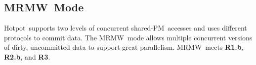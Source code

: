 \documentclass[sigconf]{acmart}
\renewcommand{\em}{\it}
\newcommand{\mycaption}[3]{\caption{\label{#1}{\bf #2} \em\small #3}}
\newcommand{\nvm}{PM}
\newcommand{\hotpot}{Hotpot}
\newcommand{\mrmw}{MRMW}
\newcommand{\cd}{CD}
\newcommand{\on}{ON}
\newcommand{\rb}{\textbf{R1.b}}
\newcommand{\rcm}{\textbf{R2.b}}
\newcommand{\re}{\textbf{R3}}
\providecommand{\DIFaddbegin}{} %
\providecommand{\DIFaddend}{} %
\providecommand{\DIFdelbegin}{} %
\providecommand{\DIFdelend}{} %
\providecommand{\DIFaddbeginFL}{} %
\providecommand{\DIFaddendFL}{} %
\providecommand{\DIFdelbeginFL}{} %
\providecommand{\DIFdelendFL}{} %
\begin{document}
{{\begin{figure}[th]
\begin{minipage}{3in}
\begin{center}
{%
}
\end{center}
\end{minipage}
\DIFdelbeginFL %
\DIFdelendFL \DIFaddbeginFL \vspace{-0.3in}
\DIFaddendFL \end{figure}
}


\DIFdelbegin %
\DIFdelend \DIFaddbegin \subsection{\mrmw\ Mode}
\DIFaddend \label{sec:mrmw}
\DIFdelbegin %
\DIFdelend \hotpot\ supports two levels of concurrent shared-\nvm\ accesses and uses different protocols to commit data.
The \mrmw\ mode allows multiple concurrent versions of dirty, uncommitted data 
to support great parallelism.
\mrmw\ meets \rb, \rcm, and \re.

}
\end{document}
